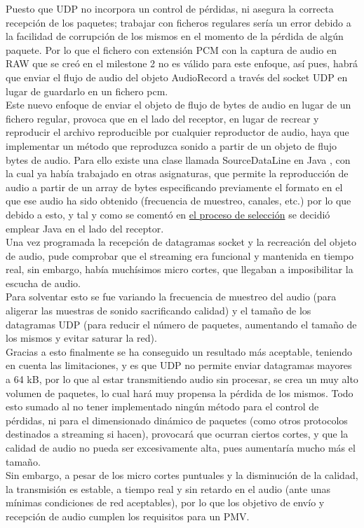 Puesto que UDP no incorpora un control de pérdidas, ni asegura la correcta
recepción de los paquetes; trabajar con ficheros regulares sería un error debido
a la facilidad de corrupción de los mismos en el momento de la pérdida de algún
paquete. Por lo que el fichero con extensión PCM con la captura de audio en RAW
que se creó en el milestone 2 no es válido para este enfoque, así pues, habrá
que enviar el flujo de audio del objeto AudioRecord a través del socket UDP en
lugar de guardarlo en un fichero pcm.\\

Este nuevo enfoque de enviar el objeto de flujo de bytes de audio en lugar de un
fichero regular, provoca que en el lado del receptor, en lugar de recrear y
reproducir el archivo reproducible por cualquier reproductor de audio, haya que
implementar un método que reproduzca sonido a partir de un objeto de flujo bytes
de audio. Para ello existe una clase llamada SourceDataLine en Java
\cite{java-SourceDataLine}, con la cual ya había trabajado en otras asignaturas,
que permite la reproducción de audio a partir de un array de bytes especificando
previamente el formato en el que ese audio ha sido obtenido (frecuencia de
muestreo, canales, etc.) por lo que debido a esto, y tal y como se comentó en
\hyperref[seleccion-streaming-receptor]{el proceso de selección} se decidió
emplear Java en el lado del receptor.\\

Una vez programada la recepción de datagramas socket y la recreación del objeto
de audio, pude comprobar que el streaming era funcional y mantenida en tiempo
real, sin embargo, había muchísimos micro cortes, que llegaban a imposibilitar
la escucha de audio.\\

Para solventar esto se fue variando la frecuencia de muestreo del audio (para
aligerar las muestras de sonido sacrificando calidad) y el tamaño de los
datagramas UDP (para reducir el número de paquetes, aumentando el tamaño de los
mismos y evitar saturar la red).\\

Gracias a esto finalmente se ha conseguido un resultado más aceptable, teniendo
en cuenta las limitaciones, y es que UDP no permite enviar datagramas mayores a
64 kB, por lo que al estar transmitiendo audio sin procesar, se crea un muy alto
volumen de paquetes, lo cual hará muy propensa la pérdida de los mismos. Todo
esto sumado al no tener implementado ningún método para el control de pérdidas,
ni para el dimensionado dinámico de paquetes (como otros protocolos destinados a
streaming si hacen), provocará que ocurran ciertos cortes, y que la calidad de
audio no pueda ser excesivamente alta, pues aumentaría mucho más el tamaño.\\

Sin embargo, a pesar de los micro cortes puntuales y la disminución de la
calidad, la transmisión es estable, a tiempo real y sin retardo en el audio
(ante unas mínimas condiciones de red aceptables), por lo que los objetivo de
envío y recepción de audio cumplen los requisitos para un PMV.
